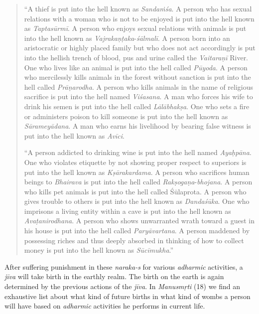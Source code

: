 {\begin{quote}
``A thief is put into the hell known as \emph{Sandaṁśa}. A person who has sexual relations with a woman who is not to be enjoyed is put into the hell known as \emph{Taptasūrmī}. A person who enjoys sexual relations with animals is put into the hell known as \emph{Vajrakaṇṭaka}-\emph{śālmalī}. A person born into an aristocratic or highly placed family but who does not act accordingly is put into the hellish trench of blood, pus and urine called the \emph{Vaitaraṇī} River. One who lives like an animal is put into the hell called \emph{Pūyoda}. A person who mercilessly kills animals in the forest without sanction is put into the hell called \emph{Prāṇarodha}. A person who kills animals in the name of religious sacrifice is put into the hell named \emph{Viśasana}. A man who forces his wife to drink his semen is put into the hell called \emph{Lālābhakṣa}. One who sets a fire or administers poison to kill someone is put into the hell known as \emph{Sārameyādana}. A man who earns his livelihood by bearing false witness is put into the hell known as \emph{Avīci}.

``A person addicted to drinking wine is put into the hell named \emph{Ayaḥpāna}. One who violates etiquette by not showing proper respect to superiors is put into the hell known as \emph{Kṣārakardama}. A person who sacrifices human beings to \emph{Bhairava} is put into the hell called \emph{Rakṣogaṇa}-\emph{bhojana}. A person who kills pet animals is put into the hell called Śūlaprota. A person who gives trouble to others is put into the hell known as \emph{Dandaśūka}. One who imprisons a living entity within a cave is put into the hell known as \emph{Avaṭanirodhana}. A person who shows unwarranted wrath toward a guest in his house is put into the hell called \emph{Paryāvartana}. A person maddened by possessing riches and thus deeply absorbed in thinking of how to collect money is put into the hell known as \emph{Sūcīmukha}.''
\end{quote}

After suffering punishment in these \emph{naraka-s} for various \emph{adharmic} activities, a \emph{jīva} will take birth in the earthly realm. The birth on the earth is again determined by the previous actions of the \emph{jīva}. In \emph{Manusmṛti} (18) we find an exhaustive list about what kind of future births in what kind of wombs a person will have based on \emph{adharmic} activities he performs in current life.

}
